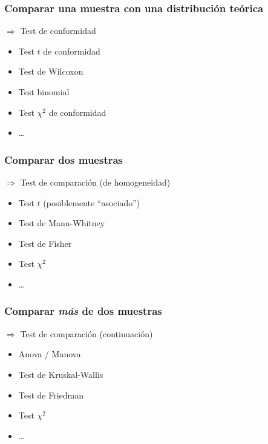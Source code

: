 \documentclass[mathserif]{beamer}
\begin{document}
\begin{frame}[label=chtest3]
   \frametitle{Comparar una muestra con una distribuci\'on te\'orica }
   \begin{block}{\alert{$\Rightarrow$ Test de conformidad}}
   \begin{itemize}
      \item Test $t$ de conformidad
      \item Test de Wilcoxon
      \item Test binomial
      \item Test $\chi^2$ de conformidad
      \item \ldots
   \end{itemize}
   \end{block}
\end{frame}%

 
\begin{frame}[label=chtest4]
   \frametitle{Comparar dos muestras}
   \begin{block}{\alert{$\Rightarrow$ Test de comparaci\'on (de homogeneidad)}}
   \begin{itemize}
      \item Test $t$ (posiblemente ``asociado'')
      \item Test de Mann-Whitney
      \item Test de Fisher
      \item Test $\chi^2$
      \item \ldots
   \end{itemize}
   \end{block}
\end{frame}%


\begin{frame}[label=chtest5]
   \frametitle{Comparar \emph{m\'as} de dos muestras}
   \begin{block}{\alert{$\Rightarrow$ Test de comparaci\'on (continuaci\'on)}}
      \begin{itemize}
         \item Anova / Manova
         \item Test de Kruskal-Wallis
         \item Test de Friedman
         \item Test $\chi^2$
         \item \ldots
      \end{itemize}
   \end{block}
  \end{frame}%
\end{document}
